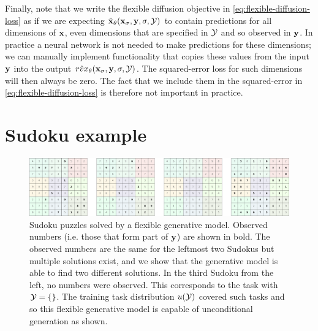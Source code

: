 Finally, note that we write the flexible diffusion objective in  \cref{eq:flexible-diffusion-loss} as if we are expecting $\hat{{\mathbf{x}}}_\theta({\mathbf{x}}_\sigma, {\mathbf{y}}, \sigma, {\mathcal{Y}})$ to contain predictions for all dimensions of ${\mathbf{x}}$, even dimensions that are specified in ${\mathcal{Y}}$ and so observed in ${\mathbf{y}}$. In practice a neural network is not needed to make predictions for these dimensions; we can manually implement functionality that copies these values from the input ${\mathbf{y}}$ into the output $\hat{rvx}_\theta({\mathbf{x}}_\sigma, {\mathbf{y}}, \sigma, {\mathcal{Y}})$. The squared-error loss for such dimensions will then always be zero. The fact that we include them in the squared-error in \cref{eq:flexible-diffusion-loss} is therefore not important in practice.

\section{Sudoku example}
\begin{figure}[t]
    \centering
    \includegraphics[width=\textwidth]{figs/thesis/sudoku_panel.pdf}
    \caption{Sudoku puzzles solved by a flexible generative model. Observed numbers (i.e. those that form part of ${\mathbf{y}}$) are shown in bold. The observed numbers are the same for the leftmost two Sudokus but multiple solutions exist, and we show that the generative model is able to find two different solutions. In the third Sudoku from the left, no numbers were observed. This corresponds to the task with ${\mathcal{Y}} = \{\}$. The training task distribution $u({\mathcal{Y}})$ covered such tasks and so this flexible generative model is capable of unconditional generation as shown. }
    \label{fig:sudoku-panel}
\end{figure}
